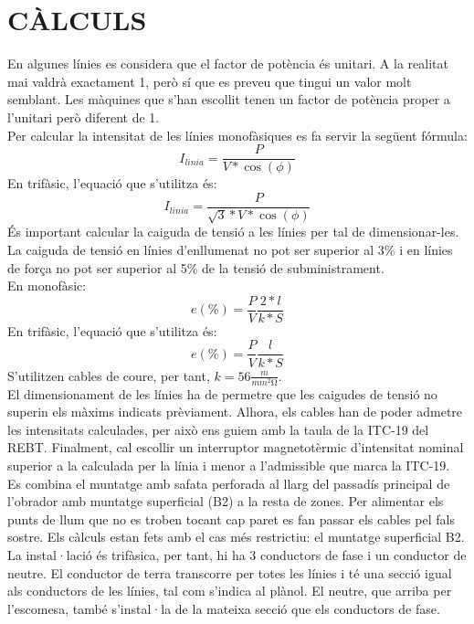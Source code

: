 \chapter{\uppercase{Càlculs}}
En algunes línies es considera que el factor de potència és unitari. A la realitat mai valdrà exactament 1, però sí que es preveu que tingui un valor molt semblant. Les màquines que s'han escollit tenen un factor de potència proper a l'unitari però diferent de 1.\\
\newline Per calcular la intensitat de les línies monofàsiques es fa servir la següent fórmula:
\begin{equation}
I_{linia} = \frac{P}{V*\cos(\phi)}
\end{equation}
En trifàsic, l'equació que s'utilitza és:
\begin{equation}
I_{linia} = \frac{P}{\sqrt3*V*\cos(\phi)}
\end{equation}
És important calcular la caiguda de tensió a les línies per tal de dimensionar-les. La caiguda de tensió en línies d'enllumenat no pot ser superior al 3\% i en línies de força no pot ser superior al 5\% de la tensió de subministrament.\\
\newline En monofàsic:
\begin{equation}
e(\%)=\frac{P}{V}\frac{2*l}{k*S}
\end{equation}
En trifàsic, l'equació que s'utilitza és:
\begin{equation}
e(\%)=\frac{P}{V}\frac{l}{k*S}
\end{equation}
S'utilitzen cables de coure, per tant, $k = 56 \frac{m}{mm^{2}\si{\ohm}}$.\\
\newline El dimensionament de les línies ha de permetre que les caigudes de tensió no superin els màxims indicats prèviament. Alhora, els cables han de poder admetre les intensitats calculades, per això ens guiem amb la taula de la ITC-19 del REBT. Finalment, cal escollir un interruptor magnetotèrmic d'intensitat nominal superior a la calculada per la línia i menor a l'admissible que marca la ITC-19.\\
\newline Es combina el muntatge amb safata perforada al llarg del passadís principal de l'obrador amb muntatge superficial (B2) a la resta de zones. Per alimentar els punts de llum que no es troben tocant cap paret es fan passar els cables pel fals sostre. Els càlculs estan fets amb el cas més restrictiu: el muntatge superficial B2.\\
\newline La instal·lació és trifàsica, per tant, hi ha 3 conductors de fase i un conductor de neutre. El conductor de terra transcorre per totes les línies i té una secció igual als conductors de les línies, tal com s'indica al plànol. El neutre, que arriba per l'escomesa, també s'instal·la de la mateixa secció que els conductors de fase.